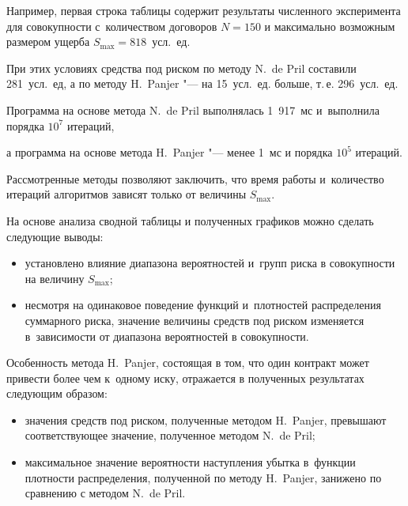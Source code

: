 Например, первая строка таблицы  содержит результаты численного эксперимента для совокупности с~количеством договоров $N=150$ и максимально возможным размером ущерба $S_{\max}=818$~усл.~ед. 

При этих условиях средства под риском  по методу N.~de Pril  составили 281~усл.~ед, а по методу H.~Panjer "--- на 15~усл.~ед. больше, т.\,е. 296~усл.~ед.

Программа на основе метода N.~de Pril выполнялась 1~917~мс и~выполнила порядка $10^7$ итераций,

а программа на основе метода H.~Panjer "--- менее 1~мс и порядка $10^5$ итераций.



Рассмотренные методы позволяют заключить, что время работы и~количество итераций алгоритмов зависят только от величины $S_{\max}$.

На основе анализа сводной таблицы и полученных графиков можно сделать следующие выводы:

\begin{itemize}

\item[1)] установлено влияние диапазона вероятностей и~групп риска в совокупности на величину $S_{\max}$;

\item[2)] несмотря на одинаковое поведение функций и~плотностей распределения суммарного риска, значение величины средств под риском изменяется в~зависимости от диапазона вероятностей в совокупности.

\end{itemize}



Особенность метода H.~Panjer, состоящая в том, что один контракт может привести более чем к~одному иску, отражается в полученных результатах следующим образом:

\begin{itemize}

\item[1)] значения средств под риском, полученные методом H.~Panjer, превышают соответствующее значение, полученное методом N.~de Pril;

\item[2)] максимальное значение вероятности наступления убытка в~функции плотности распределения, полученной по методу H.~Panjer, занижено по сравнению с методом N.~de Pril.

\end{itemize}



